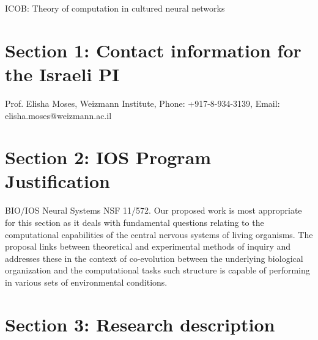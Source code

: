 \begin{center}
ICOB: Theory of computation in cultured neural networks
\end{center}
\section{Section 1: Contact information for the Israeli PI}
\noindent Prof. Elisha Moses, Weizmann Institute, Phone: +917-8-934-3139, Email: elisha.moses@weizmann.ac.il

\section{Section 2: IOS Program Justification}
\label{sec:justification}
\noindent BIO/IOS Neural Systems NSF 11/572.
Our proposed work is most appropriate for this section as it deals with fundamental questions relating to the computational capabilities of the central nervous systems of living organisms. The proposal links between theoretical and experimental methods of inquiry and addresses these in the context of co-evolution between the underlying biological organization and the computational tasks such structure is capable of performing in various sets of environmental conditions.

\section{Section 3: Research description}
\label{sec:description}

